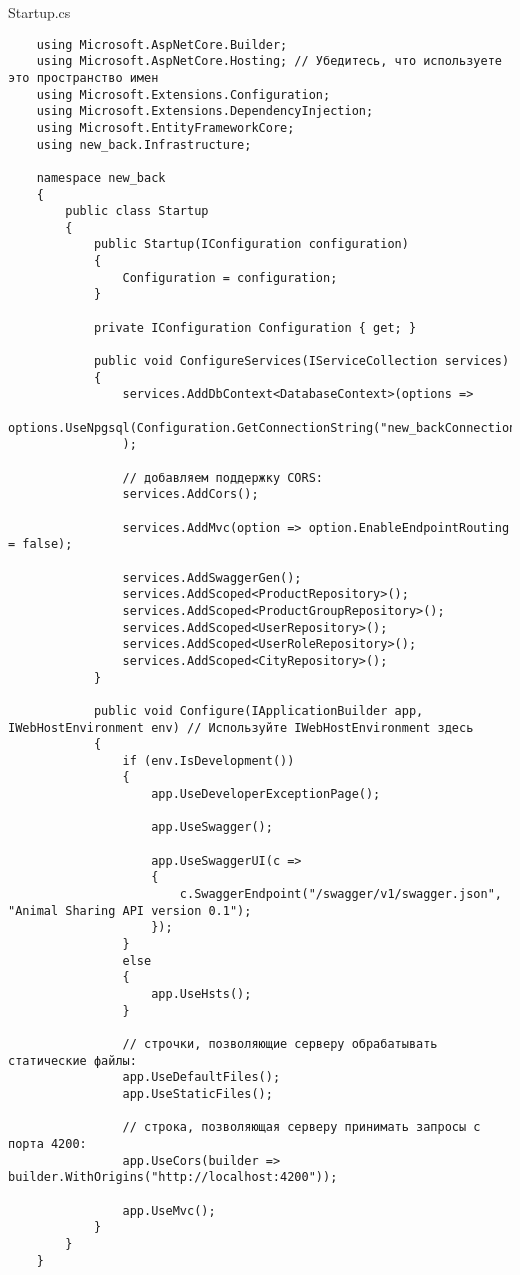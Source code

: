 Startup.cs
\lstset{style=sharpc}
\begin{lstlisting}
    using Microsoft.AspNetCore.Builder;
    using Microsoft.AspNetCore.Hosting; // Убедитесь, что используете это пространство имен
    using Microsoft.Extensions.Configuration;
    using Microsoft.Extensions.DependencyInjection;
    using Microsoft.EntityFrameworkCore;
    using new_back.Infrastructure;
    
    namespace new_back
    {
        public class Startup
        {
            public Startup(IConfiguration configuration)
            {
                Configuration = configuration;
            }
    
            private IConfiguration Configuration { get; }
    
            public void ConfigureServices(IServiceCollection services)
            {
                services.AddDbContext<DatabaseContext>(options =>
                    options.UseNpgsql(Configuration.GetConnectionString("new_backConnection"))
                );
    
                // добавляем поддержку CORS:
                services.AddCors();
    
                services.AddMvc(option => option.EnableEndpointRouting = false);
    
                services.AddSwaggerGen();
                services.AddScoped<ProductRepository>();
                services.AddScoped<ProductGroupRepository>();
                services.AddScoped<UserRepository>();
                services.AddScoped<UserRoleRepository>();
                services.AddScoped<CityRepository>();
            }
    
            public void Configure(IApplicationBuilder app, IWebHostEnvironment env) // Используйте IWebHostEnvironment здесь
            {
                if (env.IsDevelopment())
                {
                    app.UseDeveloperExceptionPage();
    
                    app.UseSwagger();
    
                    app.UseSwaggerUI(c =>
                    {
                        c.SwaggerEndpoint("/swagger/v1/swagger.json", "Animal Sharing API version 0.1");
                    });
                }
                else
                {
                    app.UseHsts();
                }
    
                // строчки, позволяющие серверу обрабатывать статические файлы:
                app.UseDefaultFiles();
                app.UseStaticFiles();
    
                // строка, позволяющая серверу принимать запросы с порта 4200:
                app.UseCors(builder => builder.WithOrigins("http://localhost:4200"));
    
                app.UseMvc();
            }
        }
    }
\end{lstlisting}

